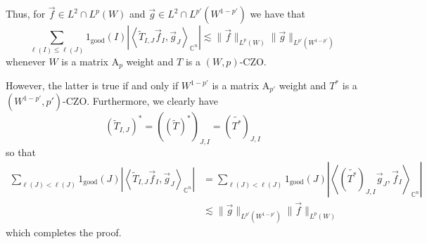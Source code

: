 \documentclass[12pt,reqno ]{amsart}
\numberwithin{equation}{section}
\theoremstyle{definition}
\newcommand{\C}{\ensuremath{\mathbb{C}^n}}
\newcommand{\V}[1]{\ensuremath{\vec{#1}}}
\newcommand{\ip}[2]{\ensuremath{\left\langle#1,#2\right\rangle}}
\newcommand{\W}[1]{\ensuremath{\widetilde{#1}}}
\begin{document}
Thus, for $\vec{f} \in L^2 \cap L^p(W)$ and $\vec{g} \in L^2\cap L^{p'}(W^{1 - p'})$ we have that \begin{equation*} \sum_{\ell(I) \leq \ell(J) } 1_\text{good} (I) \left|\ip{\widetilde{T}  _{I, J} \vec{f}_I}{\vec{g}_J}_{\C}\right| \lesssim \|\V{f}\|_{L^p(W)} \|\V{g}\|_{L^{p'}(W^{1 - p'})} \end{equation*} whenever $W$ is a matrix A${}_p$ weight and $T$ is a $(W, p)$-CZO.

However, the latter is true if and only if $W^{1-p'}$ is a matrix A${}_{p'}$ weight and $T^*$ is a $(W^{1-p'}, p')$-CZO.
Furthermore, we clearly have \begin{equation*} (\W{T}_{I, J}) ^* = {\left((\W{T} )^*\right)}_{J, I}  = (\W{T^*})_{J, I}  \end{equation*}  so that \begin{align*} \sum_{\ell(J)  < \ell(J) } 1_\text{good} (J) \left|\ip{\widetilde{T}  _{I, J} \vec{f}_I}{\vec{g}_J}_{\C}\right| & =  \sum_{\ell(J)  < \ell(J) } 1_\text{good} (J) \left|\ip{(\W{T^*})_{J, I} \vec{g}_J}{\vec{f}_I}_{\C}\right| \\ & \lesssim \|\V{g}\|_{L^{p'}(W^{1 - p'})}  \|\V{f}\|_{L^p(W)} \end{align*} which completes the proof.

\end{document}
